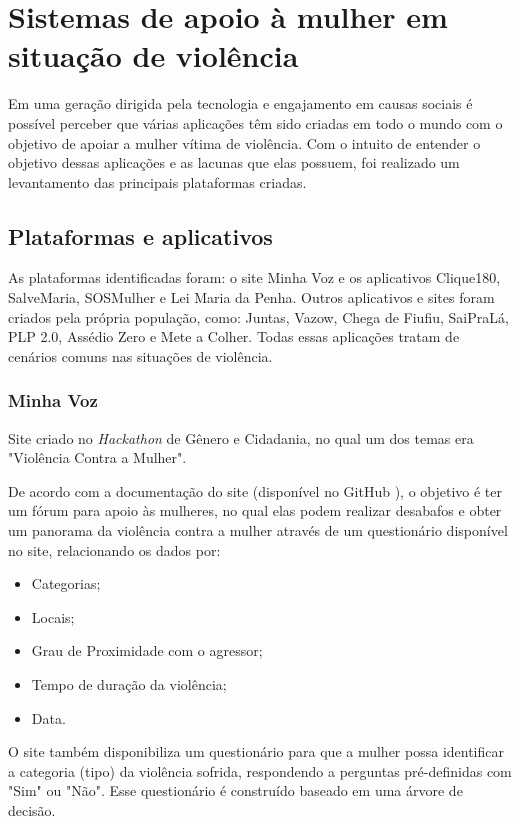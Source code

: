\chapter{Sistemas de apoio à mulher em situação de violência} \label{cap:sistemas_relacionados}

Em uma geração dirigida pela tecnologia e engajamento em causas sociais é possível perceber que várias aplicações têm sido criadas em todo o mundo 
com o objetivo de apoiar a mulher vítima de violência. Com o intuito de entender o objetivo dessas aplicações e as lacunas que elas possuem,
foi realizado um levantamento das principais plataformas criadas. 

\section{Plataformas e aplicativos}

As plataformas identificadas foram: o site Minha Voz \cite{minhavoz_site} e 
os aplicativos Clique180, SalveMaria, SOSMulher e Lei Maria da Penha. Outros aplicativos e sites foram criados pela própria população, como: Juntas, Vazow, 
Chega de Fiufiu, 
SaiPraLá, PLP 2.0, Assédio Zero e Mete a Colher. Todas essas aplicações tratam de cenários comuns nas situações de 
violência.


\subsection*{Minha Voz}

Site criado no \textit{Hackathon} de Gênero e Cidadania, no qual
um dos temas era "Violência Contra a Mulher". 

De acordo com a documentação do site (disponível no GitHub \cite{minhavoz_repo}), o objetivo é ter um fórum para apoio às mulheres, no qual elas podem
realizar desabafos e obter um panorama da violência contra a mulher através de um questionário
disponível no site, relacionando os dados por:

\begin{itemize}
	\item Categorias;
	\item Locais;
	\item Grau de Proximidade com o agressor;
	\item Tempo de duração da violência;
	\item Data.
\end{itemize}

O site também disponibiliza um questionário para que a mulher possa identificar a categoria (tipo) da violência sofrida, respondendo a perguntas pré-definidas 
com "Sim" ou "Não". Esse questionário é construído baseado em uma árvore de decisão.

